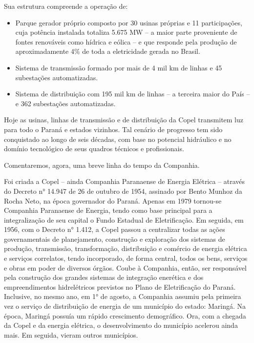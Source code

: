 \documentclass[grad,numbers]{coppe}
\providecommand{\tightlist}{%
  \setlength{\itemsep}{0pt}\setlength{\parskip}{0pt}}
\begin{document}
  Sua estrutura compreende a operação de:
  \begin{itemize}
  \tightlist
  \item
    Parque gerador próprio composto por 30 usinas próprias e 11 participações, cuja potência instalada totaliza 5.675 MW -- a maior parte proveniente de fontes renováveis como hídrica e eólica -- e que responde pela produção de aproximadamente 4\% de toda a eletricidade gerada no Brasil.
  \item
    Sistema de transmissão formado por mais de 4 mil km de linhas e 45 subestações automatizadas.
  \item
    Sistema de distribuição com 195 mil km de linhas -- a terceira maior do País -- e 362 subestações automatizadas.
  \end{itemize}
  Hoje as usinas, linhas de transmissão e de distribuição da Copel transmitem luz para todo o Paraná e estados vizinhos. Tal cenário de progresso tem sido conquistado ao longo de seis décadas, com base no potencial hidráulico e no domínio tecnológico de seus quadros técnicos e profissionais.

  Comentaremos, agora, uma breve linha do tempo da Companhia.

  Foi criada a Copel -- ainda Companhia Paranaense de Energia Elétrica -- através do Decreto n° 14.947 de 26 de outubro de 1954, assinado por Bento Munhoz da Rocha Neto, na época governador do Paraná. Apenas em 1979 tornou-se Companhia Paranaense de Energia, tendo como base principal para a integralização de seu capital o Fundo Estadual de Eletrificação. Em seguida, em 1956, com o Decreto n° 1.412, a Copel passou a centralizar todas as ações governamentais de planejamento, construção e exploração dos sistemas de produção, transmissão, transformação, distribuição e comércio de energia elétrica e serviços correlatos, tendo incorporado, de forma central, todos os bens, serviços e obras em poder de diversos órgãos. Coube à Companhia, então, ser responsável pela construção dos grandes sistemas de integração enerética e dos empreendimentos hidrelétricos previstos no Plano de Eletrificação do Paraná. Inclusive, no mesmo ano, em 1° de agosto, a Companhia assumiu pela primeira vez o serviço de distribuição de energia de um município do estado: Maringá. Na época, Maringá possuía um rápido crescimento demográfico. Ora, com a chegada da Copel e da energia elétrica, o desenvolvimento do município acelerou ainda mais. Em seguida, vieram outros municípios.
\end{document}
